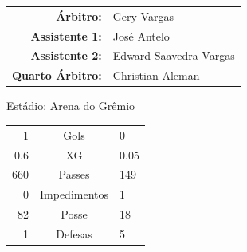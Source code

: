 \documentclass[11pt]{article}
\begin{document}
\vspace{0.5cm}
\begin{minipage}{0.65\textwidth}
\begin{center}
\begin{tabular}{rl}
\textbf{Árbitro:} & Gery Vargas \\
\textbf{Assistente 1:} & José Antelo \\
\textbf{Assistente 2:} & Edward Saavedra Vargas \\
\textbf{Quarto Árbitro:} & Christian Aleman \\
\end{tabular}
\end{center}
\end{minipage}
\begin{minipage}{0.3\textwidth}
Estádio: Arena do Grêmio\\
\begin{tabular}{rcl}
1 & Gols & 0 \\
0.6 & XG & 0.05 \\
660 & Passes & 149 \\
0 & Impedimentos & 1 \\
82 & Posse & 18 \\
1 & Defesas & 5 \\
\end{tabular}
\end{minipage}
\newpage
\end{document}
